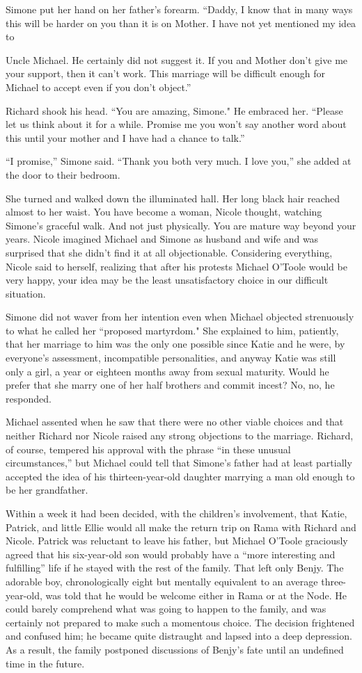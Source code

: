 \documentclass[]{article}
\begin{document}
{Simone put her hand on her father’s forearm.  “Daddy, I know that in many ways this will be harder on you than it is on Mother.  I have not yet mentioned my idea to

Uncle Michael.  He certainly did not suggest it.  If you and Mother don’t give me your support, then it can’t work.  This marriage will be difficult enough for Michael to accept even if you don’t object.”

Richard shook his head.  “You are amazing, Simone."  He embraced her.  “Please let us think about it for a while.  Promise me you won’t say another word about this until your mother and I have had a chance to talk.”

“I promise,” Simone said.  “Thank you both very much.  I love you,” she added at the door to their bedroom.

She turned and walked down the illuminated hall.  Her long black hair reached almost to her waist.  You have become a woman, Nicole thought, watching Simone’s graceful walk.  And not just physically.  You are mature way beyond your years.  Nicole imagined Michael and Simone as husband and wife and was surprised that she didn’t find it at all objectionable.  Considering everything, Nicole said to herself, realizing that after his protests Michael O’Toole would be very happy, your idea may be the least unsatisfactory choice in our difficult situation.

Simone did not waver from her intention even when Michael objected strenuously to what he called her “proposed martyrdom."  She explained to him, patiently, that her marriage to him was the only one possible since Katie and he were, by everyone’s assessment, incompatible personalities, and anyway Katie was still only a girl, a year or eighteen months away from sexual maturity.  Would he prefer that she marry one of her half brothers and commit incest? No, no, he responded.

Michael assented when he saw that there were no other viable choices and that neither Richard nor Nicole raised any strong objections to the marriage.  Richard, of course, tempered his approval with the phrase “in these unusual circumstances,” but Michael could tell that Simone’s father had at least partially accepted the idea of his thirteen-year-old daughter marrying a man old enough to be her grandfather.

Within a week it had been decided, with the children’s involvement, that Katie, Patrick, and little Ellie would all make the return trip on Rama with Richard and Nicole.  Patrick was reluctant to leave his father, but Michael O’Toole graciously agreed that his six-year-old son would probably have a “more interesting and fulfilling” life if he stayed with the rest of the family.  That left only Benjy.  The adorable boy, chronologically eight but mentally equivalent to an average three-year-old, was told that he would be welcome either in Rama or at the Node.  He could barely comprehend what was going to happen to the family, and was certainly not prepared to make such a momentous choice.  The decision frightened and confused him; he became quite distraught and lapsed into a deep depression.  As a result, the family postponed discussions of Benjy’s fate until an undefined time in the future.

}
\end{document}
